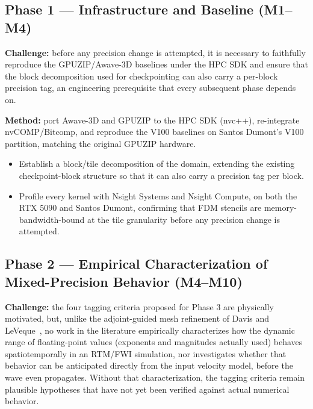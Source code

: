 \documentclass[12pt,a4paper]{article}
\begin{document}
\subsection{Phase 1 --- Infrastructure and Baseline (M1--M4)}

\textbf{Challenge:} before any precision change is attempted, it is
necessary to faithfully reproduce the GPUZIP/Awave-3D baselines under the
HPC SDK and ensure that the block decomposition used for checkpointing can
also carry a per-block precision tag, an engineering prerequisite that
every subsequent phase depends on.

\textbf{Method:} port Awave-3D and GPUZIP to the HPC SDK (nvc++),
re-integrate nvCOMP/Bitcomp, and reproduce the V100 baselines on Santos
Dumont's V100 partition, matching the original GPUZIP hardware.

\begin{itemize}
  \item Establish a block/tile decomposition of the domain, extending the
        existing checkpoint-block structure so that it can also carry a
        precision tag per block.
  \item Profile every kernel with Nsight Systems and Nsight Compute, on
        both the RTX 5090 and Santos Dumont, confirming that FDM stencils
        are memory-bandwidth-bound at the tile granularity before any
        precision change is attempted.
\end{itemize}

\subsection{Phase 2 --- Empirical Characterization of Mixed-Precision
Behavior (M4--M10)}

\textbf{Challenge:} the four tagging criteria proposed for Phase 3 are
physically motivated, but, unlike the adjoint-guided mesh refinement of
Davis and LeVeque~\cite{davis2015adjoint}, no work in the literature
empirically characterizes how the dynamic range of floating-point values
(exponents and magnitudes actually used) behaves spatiotemporally in an
RTM/FWI simulation, nor investigates whether that behavior can be
anticipated directly from the input velocity model, before the wave even
propagates. Without that characterization, the tagging criteria remain
plausible hypotheses that have not yet been verified against actual
numerical behavior.
\end{document}
